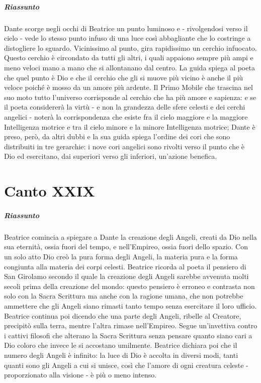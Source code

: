 \documentclass[a4paper, twoside, titlepage]{book}
\begin{document}
\paragraph{Riassunto} Dante scorge negli occhi di Beatrice un punto luminoso e - rivolgendosi verso il cielo - vede lo stesso punto infuso di una luce così abbagliante che lo costringe a distogliere lo sguardo. Vicinissimo al punto, gira rapidissimo un cerchio infuocato. Questo cerchio è circondato da tutti gli altri, i quali appaiono sempre più ampi e meno veloci mano a mano che si allontanano dal centro. La guida spiega al poeta che quel punto è Dio e che il cerchio che gli si muove più vicino è anche il più veloce poiché è mosso da un amore più ardente. Il Primo Mobile che trascina nel suo moto tutto l’universo corrisponde al cerchio che ha più amore e sapienza: e se il poeta considererà la virtù - e non la grandezza delle sfere celesti e dei cerchi angelici - noterà la corrispondenza che esiste fra il cielo maggiore e la maggiore Intelligenza motrice e tra il cielo minore e la minore Intelligenza motrice; Dante è preso, però, da altri dubbi e la sua guida spiega l’ordine dei cori che sono distribuiti in tre gerarchie: i nove cori angelici sono rivolti verso il punto che è Dio ed esercitano, dai superiori verso gli inferiori, un’azione benefica.

\chapter{Canto XXIX}

\paragraph{Riassunto} Beatrice comincia a spiegare a Dante la creazione degli Angeli, creati da Dio nella sua eternità, ossia fuori del tempo, e nell’Empireo, ossia fuori dello spazio. Con un solo atto Dio creò la pura forma degli Angeli, la materia pura e la forma congiunta alla materia dei corpi celesti. Beatrice ricorda al poeta il pensiero di San Girolamo secondo il quale la creazione degli Angeli sarebbe avvenuta molti secoli prima della creazione del mondo: questo pensiero è erroneo e contrasta non solo con la Sacra Scrittura ma anche con la ragione umana, che non potrebbe ammettere che gli Angeli siano rimasti tanto tempo senza esercitare il loro ufficio. Beatrice continua poi dicendo che una parte degli Angeli, ribelle al Creatore, precipitò sulla terra, mentre l’altra rimase nell’Empireo. Segue un’invettiva contro i cattivi filosofi che alterano la Sacra Scrittura senza pensare quanto siano cari a Dio coloro che invece le si accostano umilmente. Beatrice dichiara poi che il numero degli Angeli è infinito: la luce di Dio è accolta in diversi modi, tanti quanti sono gli Angeli a cui si unisce, così che l’amore di ogni creatura celeste - proporzionato alla visione - è più o meno intenso.
\end{document}
